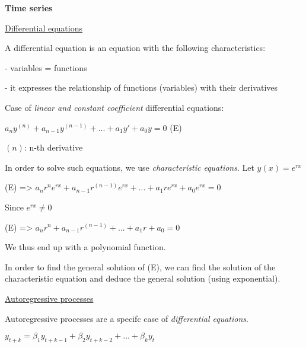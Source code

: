{\fontsize{12pt}{22pt} \textbf{Time series}\par}

\vspace{5mm}

\underline{Differential equations}

\vspace{5mm}

A differential equation is an equation with the following characteristics:

- variables = functions

- it expresses the relationship of functions (variables) with their derivatives

\vspace{5mm}

Case of \textit{linear and constant coefficient} differential equations:

\vspace{5mm}

\begin{center}
$a_ny^{(n)} + a_{n-1}y^{(n-1)} + ... + a_1y' + a_0y = 0$  (E)
\end{center}

$(n)$: n-th derivative

\vspace{5mm}

In order to solve such equations, we use \textit{characteristic equations}. Let $y(x) = e^{rx}$

(E) => $a_nr^n e^{rx} + a_{n-1}r^{(n-1)} e^{rx} + ... + a_1 r e^{rx} + a_0e^{rx} = 0$

Since $e^{rx} \neq 0$

(E) => $a_nr^n + a_{n-1}r^{(n-1)} + ... + a_1 r + a_0 = 0$

We thus end up with a polynomial function.

In order to find the general solution of (E), we can find the solution of the characteristic equation and deduce the general solution (using exponential).

\vspace{5mm}

\underline{Autoregressive processes}

\vspace{5mm}

Autoregressive processes are a specifc case of \textit{differential equations}.

\vspace{5mm}

$y_{t+k} = \beta_1 y_{t+k-1} + \beta_2 y_{t+k-2} + ... + \beta_k y_{t}$

